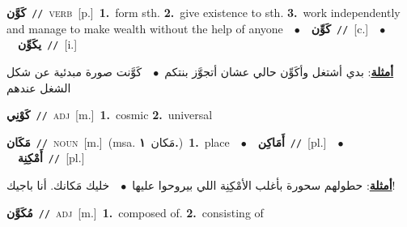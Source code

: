 \documentclass[10pt,a4paper,twoside]{article} %
\begin{document}
\begin{multicols}{2}
{\setlength\topsep{0pt}\textbf{\foreignlanguage{arabic}{كَوَّن}}\ {\color{gray}\texttt{//}\color{black}}\ \textsc{verb}\ [p.]\ \textbf{1.}~form sth.  \textbf{2.}~give existence to sth.  \textbf{3.}~work independently and manage to make wealth without the help of anyone\ \ $\bullet$\ \ \setlength\topsep{0pt}\textbf{\foreignlanguage{arabic}{كَوِّن}}\ {\color{gray}\texttt{//}\color{black}}\ [c.]\ \ $\bullet$\ \ \setlength\topsep{0pt}\textbf{\foreignlanguage{arabic}{يكَوِّن}}\ {\color{gray}\texttt{//}\color{black}}\ [i.]\  \begin{flushright}\color{gray}\foreignlanguage{arabic}{\textbf{\underline{\foreignlanguage{arabic}{أمثلة}}}: بدي أشتغل وأكَوِّن حالي عشان أتجوَّز بنتكم\ $\bullet$\ \  كَوَّنت صورة مبدئية عن شكل الشغل عندهم}\end{flushright}\color{black}} \vspace{2mm}

{\setlength\topsep{0pt}\textbf{\foreignlanguage{arabic}{كَوْنِي}}\ {\color{gray}\texttt{//}\color{black}}\ \textsc{adj}\ [m.]\ \textbf{1.}~cosmic  \textbf{2.}~universal\ } \vspace{2mm}

{\setlength\topsep{0pt}\textbf{\foreignlanguage{arabic}{مَكَان}}\ {\color{gray}\texttt{//}\color{black}}\ \textsc{noun}\ [m.]\ \color{gray}(msa. \foreignlanguage{arabic}{مَكان}~\foreignlanguage{arabic}{\textbf{١.}})\color{black}\ \textbf{1.}~place\ \ $\bullet$\ \ \setlength\topsep{0pt}\textbf{\foreignlanguage{arabic}{أَمَاكِن}}\ {\color{gray}\texttt{//}\color{black}}\ [pl.]\ \ $\bullet$\ \ \setlength\topsep{0pt}\textbf{\foreignlanguage{arabic}{أَمْكِنِة}}\ {\color{gray}\texttt{//}\color{black}}\ [pl.]\  \begin{flushright}\color{gray}\foreignlanguage{arabic}{\textbf{\underline{\foreignlanguage{arabic}{أمثلة}}}: حطولهم سحورة بأغلب الأمْكِنِة اللي بيروحوا عليها\ $\bullet$\ \  خليك مَكانك. أنا باجيك!}\end{flushright}\color{black}} \vspace{2mm}

{\setlength\topsep{0pt}\textbf{\foreignlanguage{arabic}{مُكَوَّن}}\ {\color{gray}\texttt{//}\color{black}}\ \textsc{adj}\ [m.]\ \textbf{1.}~composed of.  \textbf{2.}~consisting of\ } \vspace{2mm}


\end{multicols}
\end{document}
